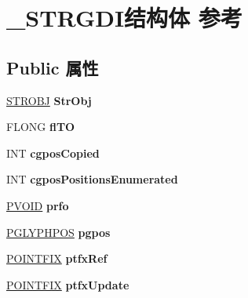 \hypertarget{struct___s_t_r_g_d_i}{}\section{\+\_\+\+S\+T\+R\+G\+D\+I结构体 参考}
\label{struct___s_t_r_g_d_i}
\subsection*{Public 属性}
\begin{DoxyCompactItemize}
\item 
\mbox{\label{struct___s_t_r_g_d_i_a9f646386919be2b020a89044151a1085}} 
\hyperlink{struct___s_t_r_o_b_j}{S\+T\+R\+O\+BJ} {\bfseries Str\+Obj}
\item 
\mbox{\label{struct___s_t_r_g_d_i_a18acf0598087bd303beedc9fded03282}} 
F\+L\+O\+NG {\bfseries fl\+TO}
\item 
\mbox{\label{struct___s_t_r_g_d_i_a31b7b77b1c69111ebdabc14989b2764e}} 
I\+NT {\bfseries cgpos\+Copied}
\item 
\mbox{\label{struct___s_t_r_g_d_i_aff512760dffc4693ff4d6164377a5063}} 
I\+NT {\bfseries cgpos\+Positions\+Enumerated}
\item 
\mbox{\label{struct___s_t_r_g_d_i_a44c61ee512c103ccfa894b0f28cf3b04}} 
\hyperlink{interfacevoid}{P\+V\+O\+ID} {\bfseries prfo}
\item 
\mbox{\label{struct___s_t_r_g_d_i_adac786abacc0cbf6aa21cc3098513227}} 
\hyperlink{struct___g_l_y_p_h_p_o_s}{P\+G\+L\+Y\+P\+H\+P\+OS} {\bfseries pgpos}
\item 
\mbox{\label{struct___s_t_r_g_d_i_ae0ac7ded877f8229a4f6af87778d3a6c}} 
\hyperlink{struct___p_o_i_n_t_f_i_x}{P\+O\+I\+N\+T\+F\+IX} {\bfseries ptfx\+Ref}
\item 
\mbox{\label{struct___s_t_r_g_d_i_a7737e724a3f48c999ca77a0d158c3c23}} 
\hyperlink{struct___p_o_i_n_t_f_i_x}{P\+O\+I\+N\+T\+F\+IX} {\bfseries ptfx\+Update}
\item 
\mbox{\label{struct___s_t_r_g_d_i_aa211020b6a8b6677c64b365a19793cd0}} 

\end{DoxyCompactItemize}
